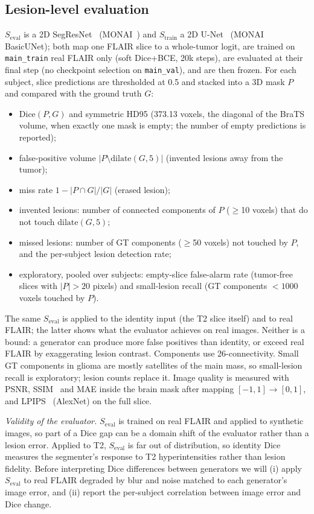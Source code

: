 \documentclass[journal]{IEEEtran}
\newcommand{\Seval}{S_{\mathrm{eval}}}
\newcommand{\Strain}{S_{\mathrm{train}}}
\begin{document}
\subsection{Lesion-level evaluation}
\label{sec:eval}
$\Seval$ is a 2D SegResNet~\cite{myronenko2018segresnet} (MONAI~\cite{cardoso2022monai}) and $\Strain$ a 2D
U-Net~\cite{ronneberger2015unet} (MONAI BasicUNet); both map one FLAIR slice to a whole-tumor logit, are trained on
\texttt{main\_train} real FLAIR only (soft Dice+BCE, 20k steps), are evaluated at their final step (no checkpoint selection on \texttt{main\_val}), and are then frozen. For each subject, slice predictions are thresholded at 0.5 and stacked into a 3D mask $P$ and compared with
the ground truth $G$:
\begin{itemize}
\item Dice$(P,G)$ and symmetric HD95 (373.13 voxels, the diagonal of the BraTS volume, when exactly one mask is empty; the number of empty predictions is reported);
\item false-positive volume $|P\setminus\mathrm{dilate}(G,5)|$ (invented lesions away from the tumor);
\item miss rate $1-|P\cap G|/|G|$ (erased lesion);
\item invented lesions: number of connected components of $P$ ($\geq$10 voxels) that do not touch $\mathrm{dilate}(G,5)$;
\item missed lesions: number of GT components ($\geq$50 voxels) not touched by $P$, and the per-subject lesion detection rate;
\item exploratory, pooled over subjects: empty-slice false-alarm rate (tumor-free slices with $|P|>20$ pixels) and small-lesion recall (GT components $<1000$ voxels touched by $P$).
\end{itemize}
The same $\Seval$ is applied to the identity input (the T2 slice itself) and to real FLAIR; the latter shows what the evaluator achieves on real images.
Neither is a bound: a generator can produce more false positives than identity, or exceed real FLAIR by exaggerating lesion
contrast. Components use 26-connectivity. Small GT components in glioma are mostly satellites of the main mass, so small-lesion recall is exploratory; lesion counts replace it. Image quality is measured with PSNR, SSIM~\cite{wang2004ssim} and MAE inside
the brain mask after mapping $[-1,1]\to[0,1]$, and LPIPS~\cite{zhang2018lpips} (AlexNet) on the full slice.

\emph{Validity of the evaluator.} $\Seval$ is trained on real FLAIR and applied to synthetic images, so part of a Dice gap
can be a domain shift of the evaluator rather than a lesion error. Applied to T2, $\Seval$ is far out of distribution, so
identity Dice measures the segmenter's response to T2 hyperintensities rather than lesion fidelity. Before interpreting
Dice differences between generators we will (i) apply $\Seval$ to real FLAIR degraded by blur and noise matched to each
generator's image error, and (ii) report the per-subject correlation between image error and Dice change.
\end{document}
